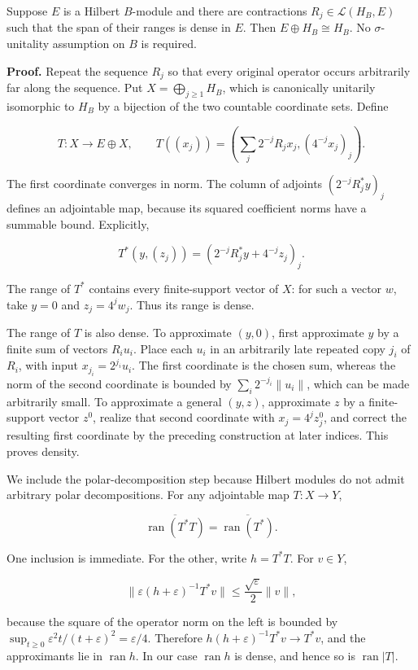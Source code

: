 \documentclass[
  11pt,
]{article}
\begin{document}
Suppose \(E\) is a Hilbert \(B\)-module and there are contractions
\(R_j\in\mathcal L(H_B,E)\) such that the span of their ranges is dense
in \(E\). Then \(E\oplus H_B\cong H_B\). No \(\sigma\)-unitality
assumption on \(B\) is required.

\textbf{Proof.} Repeat the sequence \(R_j\) so that every original
operator occurs arbitrarily far along the sequence. Put
\(X=\bigoplus_{j\geq1}H_B\), which is canonically unitarily isomorphic
to \(H_B\) by a bijection of the two countable coordinate sets. Define

\[
T:X\longrightarrow E\oplus X,\qquad
T((x_j))=\left(\sum_j2^{-j}R_jx_j,(4^{-j}x_j)_j\right).
\]

The first coordinate converges in norm. The column of adjoints
\((2^{-j}R_j^*y)_j\) defines an adjointable map, because its squared
coefficient norms have a summable bound. Explicitly,

\[
T^*(y,(z_j))=(2^{-j}R_j^*y+4^{-j}z_j)_j.
\]

The range of \(T^*\) contains every finite-support vector of \(X\): for
such a vector \(w\), take \(y=0\) and \(z_j=4^jw_j\). Thus its range is
dense.

The range of \(T\) is also dense. To approximate \((y,0)\), first
approximate \(y\) by a finite sum of vectors \(R_i u_i\). Place each
\(u_i\) in an arbitrarily late repeated copy \(j_i\) of \(R_i\), with
input \(x_{j_i}=2^{j_i}u_i\). The first coordinate is the chosen sum,
whereas the norm of the second coordinate is bounded by
\(\sum_i2^{-j_i}\|u_i\|\), which can be made arbitrarily small. To
approximate a general \((y,z)\), approximate \(z\) by a finite-support
vector \(z^0\), realize that second coordinate with \(x_j=4^jz_j^0\),
and correct the resulting first coordinate by the preceding construction
at later indices. This proves density.

We include the polar-decomposition step because Hilbert modules do not
admit arbitrary polar decompositions. For any adjointable map
\(T:X\to Y\),

\[
\overline{\operatorname{ran}(T^*T)}
=\overline{\operatorname{ran}(T^*)}.
\]

One inclusion is immediate. For the other, write \(h=T^*T\). For
\(v\in Y\),

\[
\|\varepsilon(h+\varepsilon)^{-1}T^*v\|
\leq \frac{\sqrt\varepsilon}{2}\|v\|,
\]

because the square of the operator norm on the left is bounded by
\(\sup_{t\geq0}\varepsilon^2t/(t+\varepsilon)^2=\varepsilon/4\).
Therefore \(h(h+\varepsilon)^{-1}T^*v\to T^*v\), and the approximants
lie in \(\operatorname{ran}h\). In our case \(\operatorname{ran}h\) is
dense, and hence so is \(\operatorname{ran}|T|\).
\end{document}
